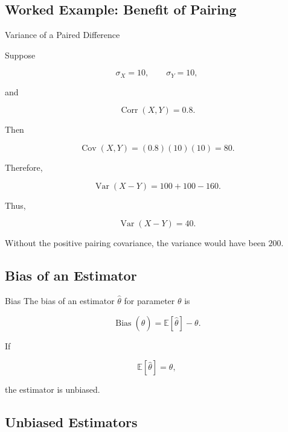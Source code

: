 \subsection{Worked Example: Benefit of Pairing}
\label{subsec:worked-benefit-pairing}

\begin{workedexamplebox}{Variance of a Paired Difference}

Suppose

\[
\sigma_X=10,
\qquad
\sigma_Y=10,
\]

and

\[
\operatorname{Corr}(X,Y)=0.8.
\]

Then

\[
\operatorname{Cov}(X,Y)
=
(0.8)(10)(10)
=
80.
\]

Therefore,

\[
\operatorname{Var}(X-Y)
=
100+100-160.
\]

Thus,

\begin{answerbox}
\[
\boxed{
\operatorname{Var}(X-Y)=40.
}
\]
\end{answerbox}

Without the positive pairing covariance, the variance would have been
\(200\).

\end{workedexamplebox}

\subsection{Bias of an Estimator}
\label{subsec:bias-estimator}

\begin{definitionbox}{Bias}
The bias of an estimator \(\widehat{\theta}\) for parameter \(\theta\) is

\[
\boxed{
\operatorname{Bias}(\widehat{\theta})
=
\mathbb{E}[\widehat{\theta}]
-
\theta.
}
\]
\end{definitionbox}

If

\[
\mathbb{E}[\widehat{\theta}]
=
\theta,
\]

the estimator is unbiased.

\subsection{Unbiased Estimators}
\label{subsec:unbiased-estimators}

